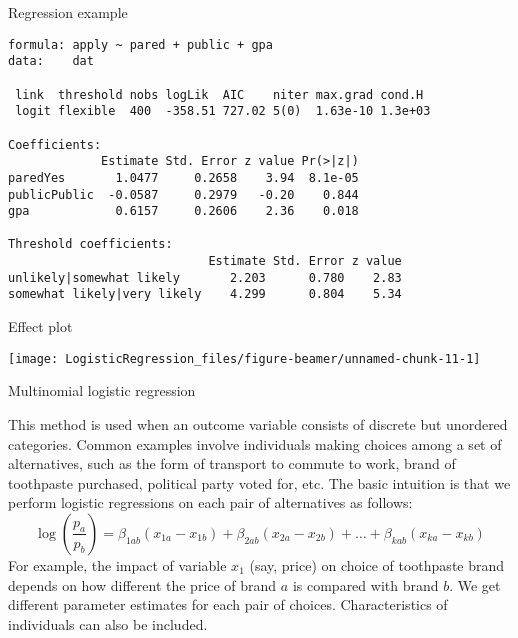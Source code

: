 \documentclass[10pt,ignorenonframetext,]{beamer}
\begin{document}
\begin{frame}[fragile]{Regression example}

\footnotesize

\begin{verbatim}
formula: apply ~ pared + public + gpa
data:    dat

 link  threshold nobs logLik  AIC    niter max.grad cond.H
 logit flexible  400  -358.51 727.02 5(0)  1.63e-10 1.3e+03

Coefficients:
             Estimate Std. Error z value Pr(>|z|)
paredYes       1.0477     0.2658    3.94  8.1e-05
publicPublic  -0.0587     0.2979   -0.20    0.844
gpa            0.6157     0.2606    2.36    0.018

Threshold coefficients:
                            Estimate Std. Error z value
unlikely|somewhat likely       2.203      0.780    2.83
somewhat likely|very likely    4.299      0.804    5.34
\end{verbatim}

\end{frame}

\begin{frame}{Effect plot}

\begin{center}\texttt{[image: LogisticRegression\_files/figure-beamer/unnamed-chunk-11-1]} \end{center}

\end{frame}

\begin{frame}{Multinomial logistic regression}

This method is used when an outcome variable consists of discrete but
unordered categories. Common examples involve individuals making choices
among a set of alternatives, such as the form of transport to commute to
work, brand of toothpaste purchased, political party voted for, etc. The
basic intuition is that we perform logistic regressions on each pair of
alternatives as follows: \[
\log\left(\frac{p_a}{p_b}\right) = \beta_{1ab} (x_{1a} - x_{1b}) + \beta_{2ab} (x_{2a} - x_{2b}) + \dots + \beta_{kab} (x_{ka} - x_{kb})
\] For example, the impact of variable \(x_1\) (say, price) on choice of
toothpaste brand depends on how different the price of brand \(a\) is
compared with brand \(b\). We get different parameter estimates for each
pair of choices. Characteristics of individuals can also be included.

\end{frame}
\end{document}
